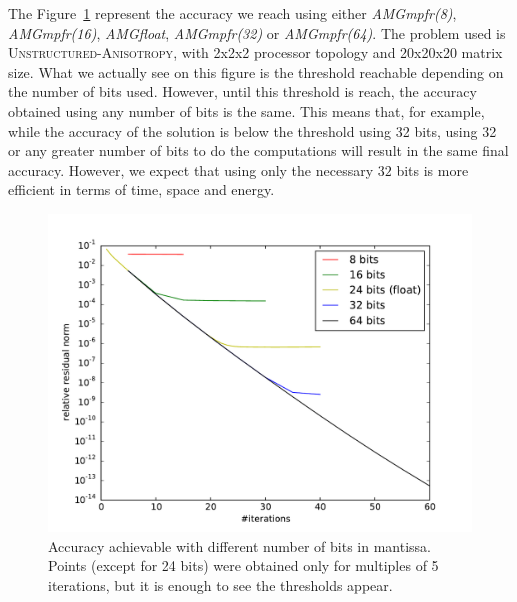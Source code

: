    The Figure~\ref{fig.bits_accuracy} represent the accuracy we reach using either \emph{AMGmpfr(8)}, \emph{AMGmpfr(16)}, \emph{AMGfloat}, \emph{AMGmpfr(32)} or \emph{AMGmpfr(64)}. The problem used is \textsc{Unstructured-Anisotropy}, with 2x2x2 processor topology and 20x20x20 matrix size.
   What we actually see on this figure is the threshold reachable depending on the number of bits used. However, until this threshold is reach, the accuracy obtained using any number of bits is the same. This means that, for example,
   while the accuracy of the solution is below the threshold using 32 bits, using 32 or any greater number of bits to do the computations will result in the same final accuracy. However, we expect that using only the necessary $32$ bits is 
   more efficient in terms of time, space and energy.
   
   \begin{figure} \centering
    \includegraphics[width=0.8\linewidth]{figs/bits_convergence.pdf}
    \caption{Accuracy achievable with different number of bits in mantissa. Points (except for 24 bits) were obtained only for multiples of 5 iterations, but it is enough to see the thresholds appear.}
    \label{fig.bits_accuracy}
   \end{figure}
   
